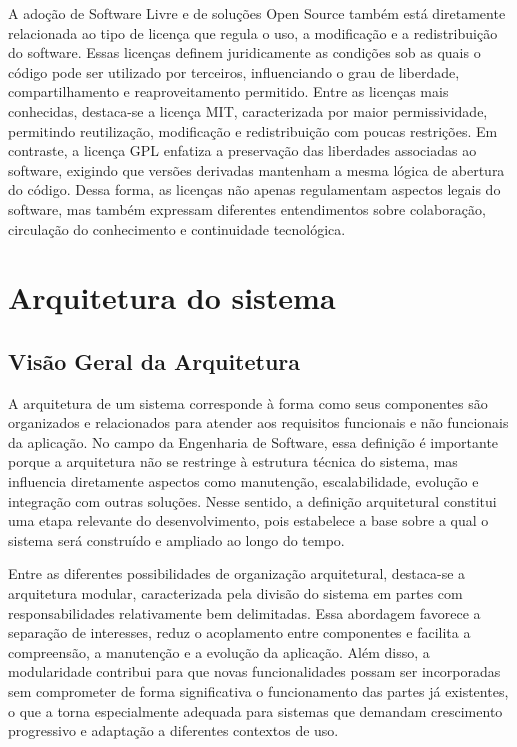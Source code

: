 \documentclass[grad,pdftex]{poli}
\begin{document}
A adoção de Software Livre e de soluções Open Source também está diretamente relacionada ao tipo de licença que regula o uso, a modificação e a redistribuição do software. Essas licenças definem juridicamente as condições sob as quais o código pode ser utilizado por terceiros, influenciando o grau de liberdade, compartilhamento e reaproveitamento permitido. Entre as licenças mais conhecidas, destaca-se a licença MIT, caracterizada por maior permissividade, permitindo reutilização, modificação e redistribuição com poucas restrições. Em contraste, a licença GPL enfatiza a preservação das liberdades associadas ao software, exigindo que versões derivadas mantenham a mesma lógica de abertura do código. Dessa forma, as licenças não apenas regulamentam aspectos legais do software, mas também expressam diferentes entendimentos sobre colaboração, circulação do conhecimento e continuidade tecnológica.\clearpage{}
    \clearpage{}\chapter{Arquitetura do sistema}
\label{chap4}

\section{Visão Geral da Arquitetura}

A arquitetura de um sistema corresponde à forma como seus componentes são organizados e relacionados para atender aos requisitos funcionais e não funcionais da aplicação. No campo da Engenharia de Software, essa definição é importante porque a arquitetura não se restringe à estrutura técnica do sistema, mas influencia diretamente aspectos como manutenção, escalabilidade, evolução e integração com outras soluções. Nesse sentido, a definição arquitetural constitui uma etapa relevante do desenvolvimento, pois estabelece a base sobre a qual o sistema será construído e ampliado ao longo do tempo.

Entre as diferentes possibilidades de organização arquitetural, destaca-se a arquitetura modular, caracterizada pela divisão do sistema em partes com responsabilidades relativamente bem delimitadas. Essa abordagem favorece a separação de interesses, reduz o acoplamento entre componentes e facilita a compreensão, a manutenção e a evolução da aplicação. Além disso, a modularidade contribui para que novas funcionalidades possam ser incorporadas sem comprometer de forma significativa o funcionamento das partes já existentes, o que a torna especialmente adequada para sistemas que demandam crescimento progressivo e adaptação a diferentes contextos de uso.
\end{document}
